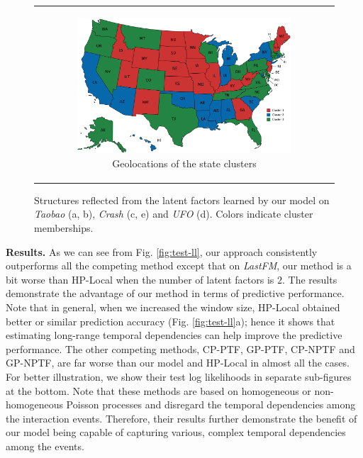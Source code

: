 \begin{figure}
\begin{tabular}[c]{ccc}
{		}
		&
		\begin{subfigure}[t]{0.4\textwidth}
			\centering
			\includegraphics[width=\textwidth]{./figs/SMIE-structure/crash-2015-state-trim.pdf}
			\caption{Geolocations of the state clusters}
		\end{subfigure}
	\end{tabular}
\vspace{-0.15in}
	\caption{\small Structures reflected from the latent factors learned by our model on \textit{Taobao} (a, b), \textit{Crash} (c, e) and \textit{UFO} (d). Colors indicate cluster memberships.}\label{fig:crash-ufo}
	\vspace{-0.2in}
\end{figure}
\textbf{Results.} As we can see from Fig. \ref{fig:test-ll}, our approach consistently outperforms all the competing method except that on \textit{LastFM}, our method is a bit worse than HP-Local when the number of latent factors is $2$. The results demonstrate the advantage of our method in terms of predictive performance. Note that in general, when we increased the window size, HP-Local obtained better or similar prediction accuracy (\eg Fig. \ref{fig:test-ll}a); hence it  shows that estimating long-range temporal dependencies can help improve the predictive performance.  The other competing methods, \eg CP-PTF, GP-PTF, CP-NPTF and GP-NPTF, are far worse than our model and HP-Local in almost all the cases. For better illustration, we show their test log likelihoods in separate sub-figures at the bottom.  Note that these methods are based on homogeneous or non-homogeneous Poisson processes and disregard the temporal dependencies among the interaction events. Therefore, their results further demonstrate the benefit of our model being capable of capturing various, complex temporal dependencies among the events. 


